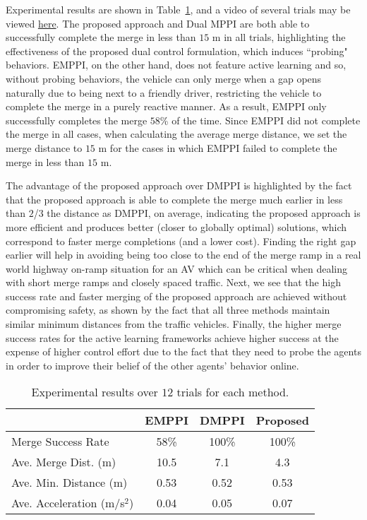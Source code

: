 \documentclass[letterpaper, 10 pt, conference]{IEEEconf}
\begin{document}
Experimental results are shown in Table~\ref{tab:results}, and a video of several trials may be viewed \href{https://youtu.be/Q_JdZuopGL4}{here}.
The proposed approach and Dual MPPI are both able to successfully complete the merge in less than $15$ m in all trials, highlighting the effectiveness of the proposed dual control formulation, which induces ``probing" behaviors.
EMPPI, on the other hand, does not feature active learning and so, without probing behaviors, the vehicle can only merge when a gap opens naturally due to being next to a friendly driver, restricting the vehicle to complete the merge in a purely reactive manner.
As a result, EMPPI only successfully completes the merge $58$\% of the time.
Since EMPPI did not complete the merge in all cases, when calculating the average merge distance, we set the merge distance to $15$ m for the cases in which EMPPI failed to complete the merge in less than $15$ m.

The advantage of the proposed approach over DMPPI is highlighted by the fact that the proposed approach is able to complete the merge much earlier in less than $2$/$3$ the distance as DMPPI, on average, indicating the proposed approach is more efficient and produces better (closer to globally optimal) solutions, which correspond to faster merge completions (and a lower cost). 
Finding the right gap earlier will help in avoiding being too close to the end of the merge ramp in a real world highway on-ramp situation for an AV which can be critical when dealing with short merge ramps and closely spaced traffic. 
Next, we see that the high success rate and faster merging of the proposed approach are achieved without compromising safety, as shown by the fact that all three methods maintain similar minimum distances from the traffic vehicles.
Finally, the higher merge success rates for the active learning frameworks achieve higher success at the expense of higher control effort due to the fact that they need to probe the agents in order to improve their belief of the other agents' behavior online. 

\begin{table}[ht]
\caption{Experimental results over $12$ trials for each method.}
\label{tab:results}

\centering
\begin{tabular}{lccc}
                                           & EMPPI & DMPPI & Proposed    \\ \hline \hline
Merge Success Rate                         & 58\%  & 100\% & 100\% \\ \hline
Ave. Merge Dist. (m)                       & 10.5   & 7.1   & 4.3   \\ \hline
Ave. Min. Distance (m)                     & 0.53  & 0.52  & 0.53 \\ \hline
Ave. Acceleration (m/s$^2$) & 0.04  & 0.05  & 0.07  
\end{tabular}
\end{table}
\end{document}
